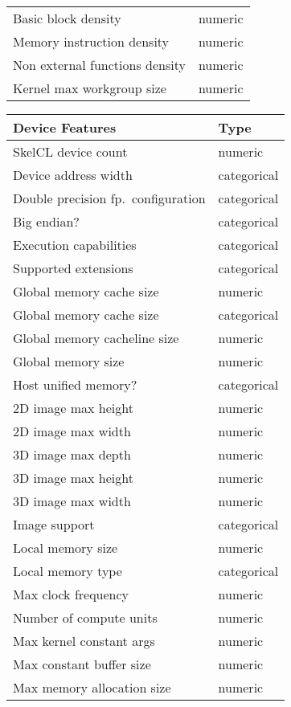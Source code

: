 \begin{table}
\begin{multicols}{2}
\begin{tabular}{p{4.5cm}p{1.3cm}}
      Basic block density & numeric \\
      Memory instruction density & numeric \\
      Non external functions density & numeric \\
      Kernel max workgroup size & numeric \\
      \bottomrule
    \end{tabular}
    \vfill
    \columnbreak
    \begin{tabular}{p{4.5cm}p{1.3cm}}
      \toprule
      \textbf{Device Features} &         \textbf{Type} \\
      \midrule
      SkelCL device count & numeric \\
      Device address width & categorical \\
      Double precision fp.\ configuration & categorical \\
      Big endian? & categorical \\
      Execution capabilities & categorical \\
      Supported extensions & categorical \\
      Global memory cache size & numeric \\
      Global memory cache size & categorical \\
      Global memory cacheline size & numeric \\
      Global memory size & numeric \\
      Host unified memory? & categorical \\
      2D image max height & numeric \\
      2D image max width & numeric \\
      3D image max depth & numeric \\
      3D image max height & numeric \\
      3D image max width & numeric \\
      Image support & categorical \\
      Local memory size & numeric \\
      Local memory type & categorical \\
      Max clock frequency & numeric \\
      Number of compute units & numeric \\
      Max kernel constant args & numeric \\
      Max constant buffer size & numeric \\
      Max memory allocation size & numeric \\

\end{tabular}
\end{multicols}
\end{table}
